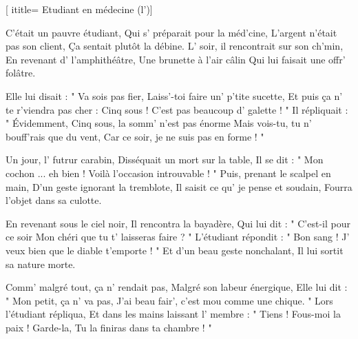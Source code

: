  [
ititle= {Etudiant en médecine (l')}]

\beginverse
C'était un pauvre étudiant,
Qui s' préparait pour la méd'cine,
L'argent n'était pas son client,
Ça sentait plutôt la débine.
L' soir, il rencontrait sur son ch'min,
En revenant d' l'amphithéâtre,
Une brunette à l'air câlin
Qui lui faisait une offr' folâtre.
\endverse

\beginverse
Elle lui disait : " Va sois pas fier,
Laiss'-toi faire un' p'tite sucette,
Et puis ça n' te r'viendra pas cher :
Cinq sous ! C'est pas beaucoup d' galette ! "
Il répliquait : " Évidemment,
Cinq sous, la somm' n'est pas énorme
Mais vois-tu, tu n' bouff'rais que du vent,
Car ce soir, je ne suis pas en forme ! "
\endverse

\beginverse
Un jour, l' futrur carabin,
Disséquait un mort sur la table,
Il se dit : " Mon cochon ... eh bien !
Voilà l'occasion introuvable ! "
Puis, prenant le scalpel en main,
D'un geste ignorant la tremblote,
Il saisit ce qu' je pense et soudain,
Fourra l'objet dans sa culotte.
\endverse

\beginverse
En revenant sous le ciel noir,
Il rencontra la bayadère,
Qui lui dit : " C'est-il pour ce soir
Mon chéri que tu t' laisseras faire ? "
L'étudiant répondit : " Bon sang !
J' veux bien que le diable t'emporte ! "
Et d'un beau geste nonchalant,
Il lui sortit sa nature morte.
\endverse

\beginverse
Comm' malgré tout, ça n' rendait pas,
Malgré son labeur énergique,
Elle lui dit : " Mon petit, ça n' va pas,
J'ai beau fair', c'est mou comme une chique. "
Lors l'étudiant répliqua,
Et dans les mains laissant l' membre :
" Tiens ! Fous-moi la paix ! Garde-la,
Tu la finiras dans ta chambre ! "
\endverse
\endsong